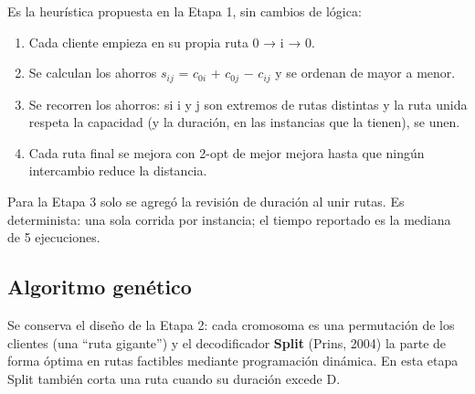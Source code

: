 \documentclass[11pt,letterpaper]{article}
\providecommand{\tightlist}{\setlength{\itemsep}{0pt}\setlength{\parskip}{0pt}}
\begin{document}
Es la heurística propuesta en la Etapa 1, sin cambios de lógica:

\begin{enumerate}
\def\labelenumi{\arabic{enumi}.}
\tightlist
\item
  Cada cliente empieza en su propia ruta 0 → i → 0.
\item
  Se calculan los ahorros \(s_{ij}\) = \(c_{0i}\) + \(c_{0j}\) − \(c_{ij}\) y se ordenan de mayor a menor.
\item
  Se recorren los ahorros: si i y j son extremos de rutas distintas y la ruta unida respeta la capacidad (y la duración, en las instancias que la tienen), se unen.
\item
  Cada ruta final se mejora con 2-opt de mejor mejora hasta que ningún intercambio reduce la distancia.
\end{enumerate}

Para la Etapa 3 solo se agregó la revisión de duración al unir rutas. Es determinista: una sola corrida por instancia; el tiempo reportado es la mediana de 5 ejecuciones.

\hypertarget{algoritmo-genuxe9tico}{%
\subsection{Algoritmo genético}\label{algoritmo-genuxe9tico}}

Se conserva el diseño de la Etapa 2: cada cromosoma es una permutación de los clientes (una ``ruta gigante'') y el decodificador \textbf{Split} (Prins, 2004) la parte de forma óptima en rutas factibles mediante programación dinámica. En esta etapa Split también corta una ruta cuando su duración excede D.
\end{document}
